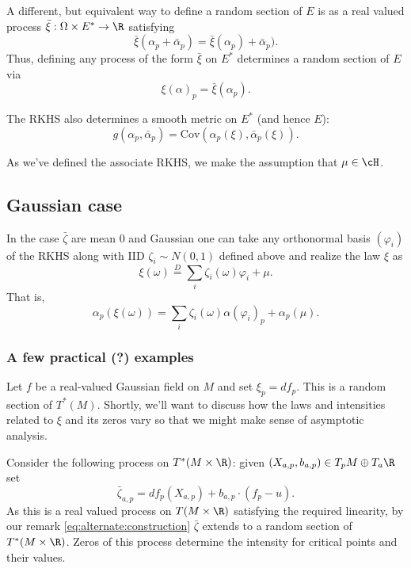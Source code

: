 \documentclass{article}
\begin{document}
A different, but equivalent way to define a random section of $E$ is as a real valued process $\bar{\xi}:\Omega \times E^* \rightarrow \R$ satisfying
\begin{equation}
  \label{eq:alternate:construction}
\bar{\xi}(\alpha_p + \bar{\alpha}_p) = \bar{\xi}(\alpha_p) + \bar{\alpha}_p).
\end{equation}
Thus, defining any process of the form $\bar{\xi}$ on $E^*$ determines a random section of $E$ via
$$
\xi(\alpha)_p = \bar{\xi}(\alpha_p).
$$

The RKHS also determines a smooth metric on $E^*$ (and hence $E$):
$$
g(\alpha_p, \bar{\alpha}_p) = \text{Cov}(\alpha_p(\xi), \bar{\alpha}_p(\xi)).
$$

As we've defined the associate RKHS, we make the assumption that $\mu \in \cH$.

\subsection{Gaussian case}

In the case $\bar{\zeta}$ are mean 0 and Gaussian one can take any orthonormal basis
$(\varphi_i)$ of the RKHS along with IID $\zeta_i \sim N(0,1)$ defined above and realize the law $\xi$ as
\begin{equation}
  \label{eq:KL}
\xi(\omega) \overset{D}{=} \sum_i \zeta_i(\omega) \varphi_i + \mu.
\end{equation}
That is,
$$
\alpha_p(\xi(\omega)) = \sum_i \zeta_i(\omega) \alpha(\varphi_i)_p + \alpha_p(\mu).
$$

\subsubsection{A few practical (?) examples}

Let $f$ be a real-valued Gaussian field on $M$ and set $\xi_p = df_p$. This is a random section of $T^*(M)$. Shortly,
we'll want to discuss how the laws and intensities related to $\xi$ and its zeros vary so that we might make
sense of asymptotic analysis. 

Consider the following process on $T^*(M \times \R)$: given $(X_{a,p}, b_{a,p}) \in T_p M \oplus T_a \R$ set
$$
\bar{\zeta}_{a,p} = df_p(X_{a,p}) + b_{a,p} \cdot (f_p - u).
$$
As this is a real valued process on $T(M \times \R)$ satisfying the required linearity, by our remark
\eqref{eq:alternate:construction} $\bar{\zeta}$ extends to a random section of $T^*(M \times \R)$. Zeros of
this process determine the intensity for critical points and their values.
\end{document}
